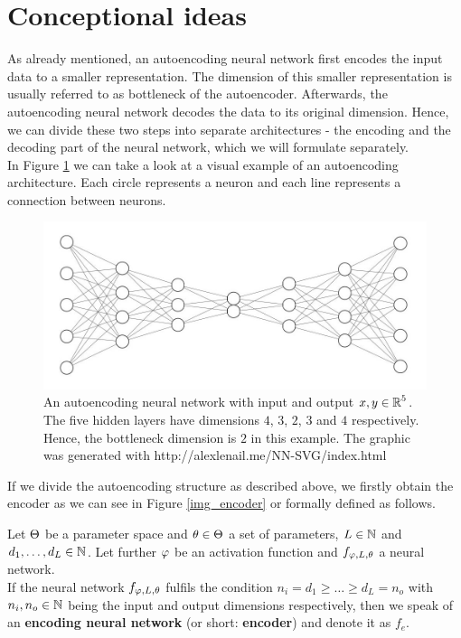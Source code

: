 \section{Conceptional ideas}
As already mentioned, an autoencoding neural network first encodes the input data to a smaller representation. The dimension of this smaller representation is usually referred to as bottleneck of the autoencoder.
Afterwards, the autoencoding neural network decodes the data to its original dimension. Hence, we can divide these two steps into separate architectures - the encoding and the decoding part of the neural network, which we will formulate separately.\\
In Figure \ref{fig:autoencoder} we can take a look at a visual example of an autoencoding architecture. Each circle represents a neuron and each line represents a connection between neurons.


\begin{figure}
\begin{center}
   \begin{minipage}[b]{0.9\linewidth}
      \includegraphics[width=\linewidth]{autoencoder}
      \caption{An autoencoding neural network with input and output $x, y\in \operatorname{\mathbb{R}}^5$. The five hidden layers have dimensions $4$, $3$, $2$, $3$ and $4$ respectively. Hence, the bottleneck dimension is $2$ in this example. The graphic was generated with http://alexlenail.me/NN-SVG/index.html}\label{fig:autoencoder}
	\end{minipage}
\end{center}
\end{figure}


If we divide the autoencoding structure as described above, we firstly obtain the encoder as we can see in Figure \ref{img_encoder} or formally defined as follows.

\begin{definition}\label{def_encoder}
Let $\operatorname{\Theta}$ be a parameter space and $\theta \in \operatorname{\Theta}$ a set of parameters, $L\in \operatorname{\mathbb{N}}$ and $d_1,\ldots, d_L\in\operatorname{\mathbb{N}}$. Let further $\operatorname{\varphi}$ be an activation function and $f_{\operatorname{\varphi},L,\theta}$ a neural network.\\
If the neural network $f_{\operatorname{\varphi},L,\theta}$ fulfils the condition $n_i= d_1 \geq \ldots \geq d_L = n_o$ with $n_i, n_o \in \operatorname{\mathbb{N}}$ being the input and output dimensions respectively, then we speak of an \textbf{encoding neural network} (or short: \textbf{encoder}) and denote it as $f_e$.
\end{definition}


